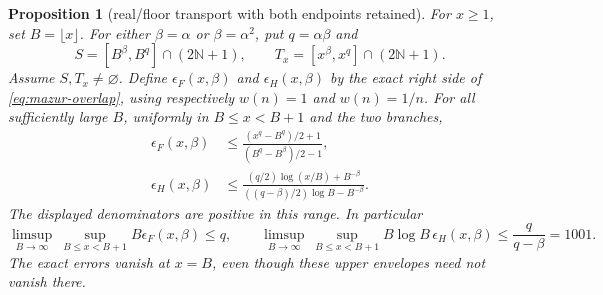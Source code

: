 \documentclass[11pt]{article}
\newtheorem{proposition}{Proposition}
\theoremstyle{remark}\newtheorem{remark}[proposition]{Remark}
\begin{document}
\begin{proposition}[real/floor transport with both endpoints retained]
\label{prop:mazur-real-overlap}
For \(x\ge1\), set \(B=\lfloor x\rfloor\). For either
\(\beta=\alpha\) or \(\beta=\alpha^2\), put \(q=\alpha\beta\) and
\[
 S=[B^\beta,B^q]\cap(2\mathbb N+1),\qquad
 T_x=[x^\beta,x^q]\cap(2\mathbb N+1).
\]
Assume \(S,T_x\ne\varnothing\). Define \(\epsilon_F(x,\beta)\) and
\(\epsilon_H(x,\beta)\) by the exact right side of
\eqref{eq:mazur-overlap}, using respectively \(w(n)=1\) and \(w(n)=1/n\).
For all sufficiently large \(B\), uniformly in \(B\le x<B+1\) and
the two branches,
\begin{align}
 \epsilon_F(x,\beta)
 &\le
 \frac{(x^q-B^q)/2+1}{(B^q-B^\beta)/2-1},
 \label{eq:mazur-real-flat}\\
 \epsilon_H(x,\beta)
 &\le
 \frac{(q/2)\log(x/B)+B^{-\beta}}
      {((q-\beta)/2)\log B-B^{-\beta}}.
 \label{eq:mazur-real-harmonic}
\end{align}
The displayed denominators are positive in this range.
In particular
\[
 \limsup_{B\to\infty}\ \sup_{B\le x<B+1} B\epsilon_F(x,\beta)\le q,
 \qquad
 \limsup_{B\to\infty}\ \sup_{B\le x<B+1}
 B\log B\,\epsilon_H(x,\beta)\le
 \frac{q}{q-\beta}=1001.
\]
The exact errors vanish at \(x=B\), even though these upper envelopes
need not vanish there.
\end{proposition}
\end{document}
